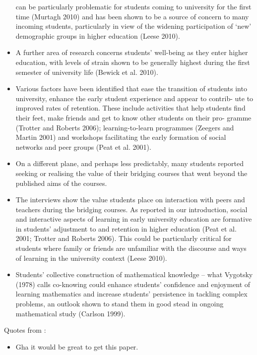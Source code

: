 \documentclass[twoside,12pt,a4paper]{report}
\begin{document}
\begin{itemize}
can be particularly problematic for students coming to university for the first
time (Murtagh 2010) and has been shown to be a source of concern to many
incoming students, particularly in view of the widening participation of
‘new’ demographic groups in higher education (Leese 2010).
	\item A further area
of research concerns students’ well-being as they enter higher education,
with levels of strain shown to be generally highest during the first semester
of university life (Bewick et al. 2010).
	\item Various factors have been identified that ease the transition of students
into university, enhance the early student experience and appear to contrib-
ute to improved rates of retention. These include activities that help students
find their feet, make friends and get to know other students on their pro-
gramme (Trotter and Roberts 2006); learning-to-learn programmes (Zeegers
and Martin 2001) and workshops facilitating the early formation of social
networks and peer groups (Peat et al. 2001).
	\item On a different plane, and perhaps less predictably, many students
reported seeking or realising the value of their bridging courses that went
beyond the published aims of the courses.
	\item The interviews show the value students place on interaction with peers
and teachers during the bridging courses. As reported in our introduction,
social and interactive aspects of learning in early university education are
formative in students’ adjustment to and retention in higher education (Peat
et al. 2001; Trotter and Roberts 2006). This could be particularly critical for
students where family or friends are unfamiliar with the discourse and ways
of learning in the university context (Leese 2010).
	\item Students’ collective construction of mathematical knowledge – what
Vygotsky (1978) calls co-knowing could enhance students’ confidence and
enjoyment of learning mathematics and increase students’ persistence in
tackling complex problems, an outlook shown to stand them in good stead
in ongoing mathematical study (Carlson 1999).
\end{itemize}

Quotes from \cite{Nicholas2015}:
\begin{itemize}
	\item Gha it would be great to get this paper.
\end{itemize}
\end{document}
